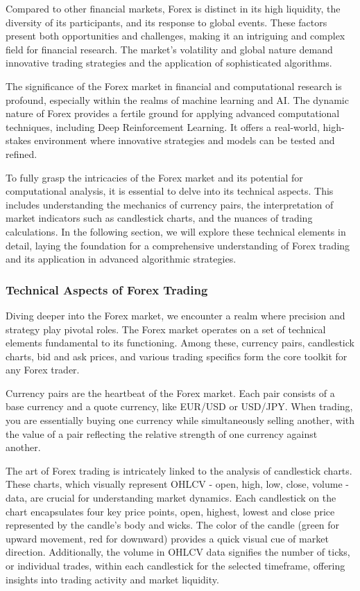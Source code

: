 Compared to other financial markets, Forex is distinct in its high liquidity, the diversity of its participants, and its response to global events. These factors present both opportunities and challenges, making it an intriguing and complex field for financial research. The market's volatility and global nature demand innovative trading strategies and the application of sophisticated algorithms.

The significance of the Forex market in financial and computational research is profound, especially within the realms of machine learning and AI. The dynamic nature of Forex provides a fertile ground for applying advanced computational techniques, including Deep Reinforcement Learning. It offers a real-world, high-stakes environment where innovative strategies and models can be tested and refined.

To fully grasp the intricacies of the Forex market and its potential for computational analysis, it is essential to delve into its technical aspects. This includes understanding the mechanics of currency pairs, the interpretation of market indicators such as candlestick charts, and the nuances of trading calculations. In the following section, we will explore these technical elements in detail, laying the foundation for a comprehensive understanding of Forex trading and its application in advanced algorithmic strategies.

\subsubsection{Technical Aspects of Forex Trading}

Diving deeper into the Forex market, we encounter a realm where precision and strategy play pivotal roles. The Forex market operates on a set of technical elements fundamental to its functioning. Among these, currency pairs, candlestick charts, bid and ask prices, and various trading specifics form the core toolkit for any Forex trader.

Currency pairs are the heartbeat of the Forex market. Each pair consists of a base currency and a quote currency, like EUR/USD or USD/JPY. When trading, you are essentially buying one currency while simultaneously selling another, with the value of a pair reflecting the relative strength of one currency against another.

The art of Forex trading is intricately linked to the analysis of candlestick charts. These charts, which visually represent OHLCV - open, high, low, close, volume - data, are crucial for understanding market dynamics. Each candlestick on the chart encapsulates four key price points, open, highest, lowest and close price represented by the candle's body and wicks. The color of the candle (green for upward movement, red for downward) provides a quick visual cue of market direction. Additionally, the volume in OHLCV data signifies the number of ticks, or individual trades, within each candlestick for the selected timeframe, offering insights into trading activity and market liquidity.

